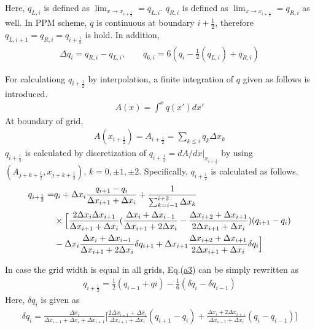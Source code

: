 Here, \(q_{L,i}\) is defined as \(\lim_{x \to x_{i+\frac{1}{2}}}=q_{L,i}\). \(q_{R,i}\) is defined as \(\lim_{x \to x_{i+\frac{1}{2}}}=q_{R,i}\) as well. In PPM scheme, \(q\) is continuous at boundary
\(i+\frac{1}{2}\), therefore \(q_{L,i+1}=q_{R,i}=q_{i+\frac{1}{2}}\) is hold. In addition, \begin{eqnarray}\Delta q_{i}=q_{R,i}-q_{L,i},\qquad q_{6,i}=6(q_{i}-\frac{1}{2}(q_{L,i})+q_{R,i})\end{eqnarray}

For calculationg \(q_{i+\frac{1}{2}}\) by interpolation, a finite integration of \(q\) given as follows is introduced. \begin{eqnarray}A(x)= \int^{x} q(x') dx'\end{eqnarray} At boundary of grid,
\begin{eqnarray}A(x_{i+\frac{1}{2}})=A_{i+\frac{1}{2}}=\sum_{k\leq i}q_{k}\Delta x_{k}\end{eqnarray} \(q_{i+\frac{1}{2}}\) is calculated by discretization of \(q_{i+\frac{1}{2}}=dA/dx |_{x_{i+\frac{1}{2}}}\) by using
\((A_{j+k+\frac{1}{2}},x_{j+k+\frac{1}{2}})\), \(k=0,\pm 1, \pm 2\). Specifically, \(q_{i+\frac{1}{2}}\) is calculated as follows. \begin{eqnarray}\label{a3}
  \begin{aligned}
    q_{i+\frac{1}{2}}=&q_{i}+\Delta x_{i} \frac{q_{i+1}-q_{i}}{\Delta x_{i+1}+\Delta x_{i}}+\frac{1}{\sum_{k=i-1}^{i+2}\Delta x_{k}}\\
    &\times \Bigl[\frac{2\Delta x_{i}\Delta x_{i+1}}{\Delta x_{i+1}+\Delta x_{i}}(\frac{\Delta x_{i}+\Delta x_{i-1}}{\Delta x_{i+1}+2\Delta x_{i}}-\frac{\Delta x_{i+2}+\Delta x_{i+1}}{2\Delta x_{i+1}+\Delta x_{i}})(q_{i+1}-q_{i})\\
     & -\Delta x_{i}\frac{\Delta x_{i}+\Delta x_{i-1}}{\Delta x_{i+1}+2\Delta x_{i}} \delta q_{i+1}+\Delta x_{i+1} \frac{\Delta x_{i+2}+\Delta x_{i+1}}{2\Delta x_{i+1}+\Delta x_{i}} \delta q_{i}\Bigr]
  \end{aligned}\end{eqnarray}

In case the grid width is equal in all grids, Eq.(\url{a3}) can be simply rewritten as \begin{eqnarray}q_{i+\frac{1}{2}}=\frac{1}{2}(q_{i-1}+q{i})-\frac{1}{6}(\delta q_{i}-\delta q_{i-1})\end{eqnarray} Here, \(\delta q_{i}\)
is given as
\begin{eqnarray}\delta q_{i}=\frac{\Delta x_{i}}{\Delta x_{i-1}+\Delta x_{i}+\Delta x_{i+1}}\biggl[\frac{2\Delta x_{i-1}+\Delta x_{i}}{\Delta x_{i+1}+\Delta x_{i}}(q_{i+1}-q_{i})+\frac{\Delta x_{i}+2\Delta x_{i+1}}{\Delta x_{i-1}+\Delta x_{i}}(q_{i}-q_{i-1})\biggr]\end{eqnarray}


